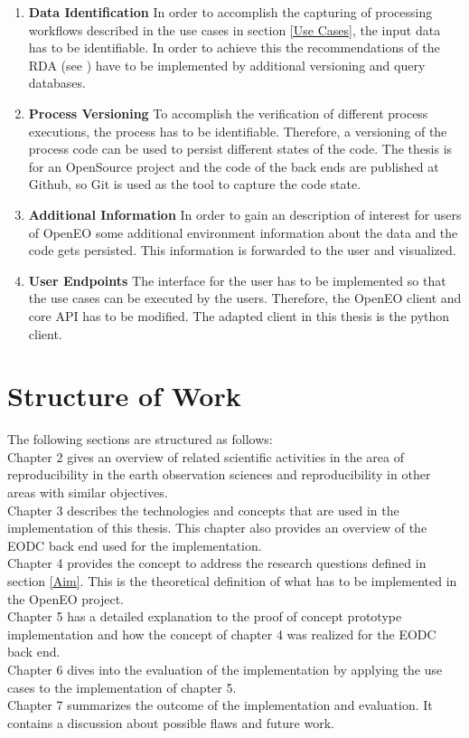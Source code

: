 \documentclass[draft,final]{vutinfth} %
\begin{document}
\begin{enumerate}
	\item \textbf{Data Identification}
	In order to accomplish the capturing of processing workflows described in the use cases in section \ref{Use Cases}, the input data has to be identifiable. In order to achieve this the recommendations of the RDA (see \cite{Rauber2016IdentificationOR}) have to be implemented by additional versioning and query databases. 
	
	\item \textbf{Process Versioning}
	To accomplish the verification of different process executions, the process has to be identifiable. Therefore, a versioning of the process code can be used to persist different states of the code. The thesis is for an OpenSource project and the code of the back ends are published at Github, so Git is used as the tool to capture the code state. 
	
	\item \textbf{Additional Information}
	In order to gain an description of interest for users of OpenEO some additional environment information about the data and the code gets persisted. This information is forwarded to the user and visualized.   
	
	\item \textbf{User Endpoints}
	The interface for the user has to be implemented so that the use cases can be executed by the users. Therefore, the OpenEO client and core API has to be modified. The adapted client in this thesis is the python client. 
\end{enumerate}

\section{Structure of Work}\label{Structure}
The following sections are structured as follows:\\
Chapter 2 gives an overview of related scientific activities in the area of reproducibility in the earth observation sciences and reproducibility in other areas with similar objectives.\\
Chapter 3  describes the technologies and concepts that are used in the implementation of this thesis. This chapter also provides an overview of the EODC back end used for the implementation.\\
Chapter 4 provides the concept to address the research questions defined in section \ref{Aim}.  This is the theoretical definition of what has to be implemented in the OpenEO project.\\
Chapter 5 has a detailed explanation to the proof of concept prototype implementation and how the concept of chapter 4 was realized for the EODC back end. \\
Chapter 6 dives into the evaluation of the implementation by applying the use cases to the implementation of chapter 5.\\
Chapter 7 summarizes the outcome of the implementation and evaluation. It contains a discussion about possible flaws and future work. \\
\end{document}
